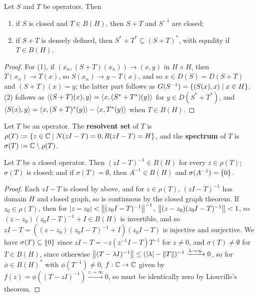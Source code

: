 \documentclass[10pt]{amsart}
\begin{document}
\begin{lemma}
    Let $S$ and $T$ be operators. Then
    \begin{enumerate}
        \item if $S$ is closed and $T \in B(H)$, then $S + T$ and $S^{-1}$ are closed;
        \item if $S + T$ is densely defined, then $S^* + T^* \subseteq (S + T)^*$, with equality if $T \in B(H)$.
    \end{enumerate}
\end{lemma}
\begin{proof}
    For (1), if $(x_n, (S + T)(x_n)) \to (x, y)$ in $H \times H$, then $T(x_n) \to T(x)$, so $S(x_n) \to y - T(x)$, and so $x \in D(S) = D(S + T)$ and $(S + T)(x) = y$; the latter part follows as $G(S^{-1}) = \left\{  (S(x), x) \mid x \in H  \right\}$. (2) follows as $\left\langle (S + T)(x), y \right\rangle = \left\langle x, (S^* + T^*)(y) \right\rangle$ for $y \in D(S^* + T^*)$, and $\left\langle S(x), y \right\rangle = \left\langle x, (S + T)^*(y) \right\rangle - \left\langle x, T^*(y) \right\rangle$ when $T \in B(H)$.
\end{proof}
\begin{definition}
    Let $T$ be an operator. The \textbf{resolvent set} of $T$ is $\rho(T) \vcentcolon= \left\{  z \in \mathbb{C} \mid N(zI - T) = 0, R(zI - T) = H  \right\}$, and the \textbf{spectrum} of $T$ is $\sigma(T) \vcentcolon= \mathbb{C} \setminus \rho(T)$.
\end{definition}
\begin{proposition}\label{closedprops}
    Let $T$ be a closed operator. Then $(zI - T)^{-1} \in B(H)$ for every $z \in \rho(T)$; $\sigma(T)$ is closed; and if $\sigma(T) = \emptyset$, then $A^{-1} \in B(H)$ and $\sigma(A^{-1}) = \left\{  0  \right\}$.
\end{proposition}
\begin{proof}
    Each $zI - T$ is closed by above, and for $z \in \rho(T)$, $(zI - T)^{-1}$ has domain $H$ and closed graph, so is continuous by the closed graph theorem. If $z_0 \in \rho(T)$, then for $\left| z - z_0 \right| < \left\| (z_0I - T)^{-1} \right\|^{-1}$, $\left\| (z - z_0)(z_0I - T)^{-1} \right\| < 1$, so $(z - z_0)(z_0I - T)^{-1} + I \in B(H)$ is invertible, and so $zI - T = ((z - z_0)(z_0I - T)^{-1} + I)(z_0I - T)$ is injective and surjective. We have $\sigma(T) \subseteq \left\{  0  \right\}$ since $zI - T = -z(z^{-1}I - T)T^{-1}$ for $z \neq 0$, and $\sigma(T) \neq \emptyset$ for $T \in B(H)$, since otherwise $\left\| (T - \lambda I)^{-1} \right\| \leq (\left| \lambda \right| - \left\| T \right\|)^{-1} \xrightarrow{\lambda \to \infty} 0$, so for $\phi \in B(H)^*$ with $\phi(T^{-1}) \neq 0$, $f : \mathbb{C} \to \mathbb{C}$ given by $f(z) = \phi((T - z I)^{-1}) \xrightarrow{z \to \infty} 0$, so must be identically zero by Liouville's theorem. 
\end{proof}
\end{document}
